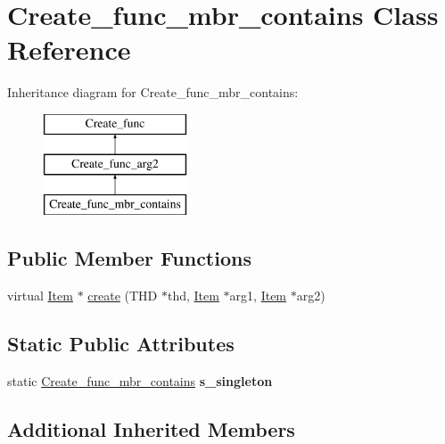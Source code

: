 \hypertarget{classCreate__func__mbr__contains}{}\section{Create\+\_\+func\+\_\+mbr\+\_\+contains Class Reference}
\label{classCreate__func__mbr__contains}
Inheritance diagram for Create\+\_\+func\+\_\+mbr\+\_\+contains\+:\begin{figure}[H]
\begin{center}
\leavevmode
\includegraphics[height=3.000000cm]{classCreate__func__mbr__contains}
\end{center}
\end{figure}
\subsection*{Public Member Functions}
\begin{DoxyCompactItemize}
\item 
virtual \mbox{\hyperlink{classItem}{Item}} $\ast$ \mbox{\hyperlink{classCreate__func__mbr__contains_a609e085bb6561bf8189b982376583b08}{create}} (T\+HD $\ast$thd, \mbox{\hyperlink{classItem}{Item}} $\ast$arg1, \mbox{\hyperlink{classItem}{Item}} $\ast$arg2)
\end{DoxyCompactItemize}
\subsection*{Static Public Attributes}
\begin{DoxyCompactItemize}
\item 
\mbox{\label{classCreate__func__mbr__contains_ae2223ffd186310bb1d27454cc4b54a3e}} 
static \mbox{\hyperlink{classCreate__func__mbr__contains}{Create\+\_\+func\+\_\+mbr\+\_\+contains}} {\bfseries s\+\_\+singleton}
\end{DoxyCompactItemize}
\subsection*{Additional Inherited Members}


